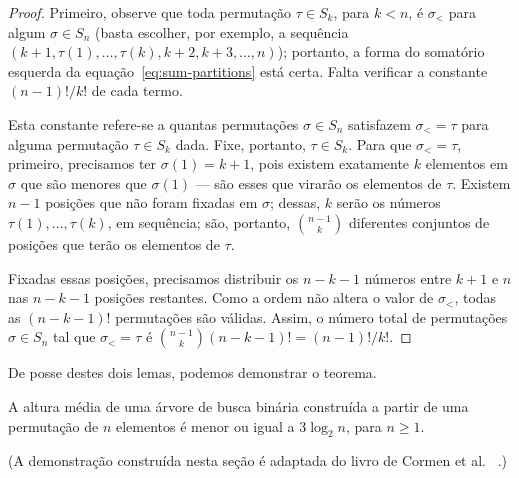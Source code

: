 \begin{proof}
    Primeiro,
    observe que toda permutação $\tau \in S_k$, para $k < n$,
    é $\sigma_<$ para algum $\sigma \in S_n$
    (basta escolher, por exemplo,
    a sequência $(k+1, \tau(1), \dots, \tau(k), k+2, k+3, \dots, n)$);
    portanto,
    a forma do somatório esquerda da equação~\ref{eq:sum-partitions} está certa.
    Falta verificar a constante $(n-1)!/k!$ de cada termo.

    Esta constante refere-se a quantas permutações $\sigma \in S_n$
    satisfazem $\sigma_< = \tau$ para alguma permutação $\tau \in S_k$ dada.
    Fixe, portanto, $\tau \in S_k$.
    Para que $\sigma_< = \tau$,
    primeiro, precisamos ter $\sigma(1) = k+1$,
    pois existem exatamente $k$ elementos em $\sigma$ que são menores que $\sigma(1)$
    --- são esses que virarão os elementos de $\tau$.
    Existem $n-1$ posições que não foram fixadas em $\sigma$;
    dessas, $k$ serão os números $\tau(1), \dots, \tau(k)$,
    em sequência;
    são, portanto, $\binom{n-1}{k}$ diferentes conjuntos de posições
    que terão os elementos de $\tau$.

    Fixadas essas posições,
    precisamos distribuir os $n - k - 1$ números entre $k+1$ e $n$
    nas $n - k - 1$ posições restantes.
    Como a ordem não altera o valor de $\sigma_<$,
    todas as $(n - k - 1)!$ permutações são válidas.
    Assim, o número total de permutações $\sigma \in S_n$
    tal que $\sigma_< = \tau$ é $\binom{n-1}{k} (n-k-1)! = (n-1)!/k!$.
\end{proof}

De posse destes dois lemas,
podemos demonstrar o teorema.

\begin{theorem}
    A altura média de uma árvore de busca binária
    construída a partir de uma permutação de $n$ elementos
    é menor ou igual a $3 \log_2 n$, para $n \geq 1$.
\end{theorem}

(A demonstração construída nesta seção é adaptada do livro de Cormen et al.%
~\cite[p.~300]{CormenLeisersonRivestStein2009}.)


